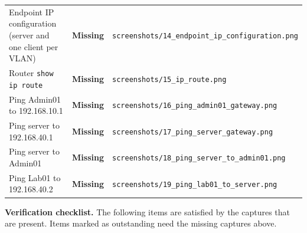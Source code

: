 \documentclass[11pt,a4paper]{article}
\newcommand{\shot}[1]{\texttt{\footnotesize screenshots/}\newline\texttt{\footnotesize #1}}
\begin{document}
\begin{longtable}{@{}L{0.36\textwidth} L{0.14\textwidth} L{0.44\textwidth}@{}}
Endpoint IP configuration (server and one client per VLAN) & \textbf{Missing} & \shot{14\_endpoint\_ip\_configuration.png} \\
Router \texttt{show ip route} & \textbf{Missing} & \shot{15\_ip\_route.png} \\
Ping Admin01 to 192.168.10.1 & \textbf{Missing} & \shot{16\_ping\_admin01\_gateway.png} \\
Ping server to 192.168.40.1 & \textbf{Missing} & \shot{17\_ping\_server\_gateway.png} \\
Ping server to Admin01 & \textbf{Missing} & \shot{18\_ping\_server\_to\_admin01.png} \\
Ping Lab01 to 192.168.40.2 & \textbf{Missing} & \shot{19\_ping\_lab01\_to\_server.png} \\
\bottomrule
\end{longtable}

\noindent
\textbf{Verification checklist.} The following items are satisfied by the captures that
are present. Items marked as outstanding need the missing captures above.
\end{document}
